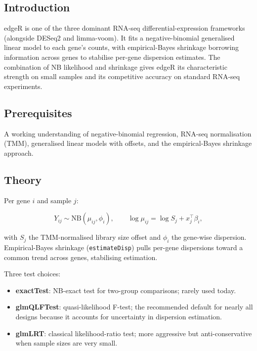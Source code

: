 \documentclass[
]{article}
\author{}
\date{\vspace{-2.5em}}
\providecommand{\tightlist}{%
  \setlength{\itemsep}{0pt}\setlength{\parskip}{0pt}}
\begin{document}
\subsection{Introduction}\label{introduction}

edgeR is one of the three dominant RNA-seq differential-expression
frameworks (alongside DESeq2 and limma-voom). It fits a
negative-binomial generalised linear model to each gene's counts, with
empirical-Bayes shrinkage borrowing information across genes to
stabilise per-gene dispersion estimates. The combination of NB
likelihood and shrinkage gives edgeR its characteristic strength on
small samples and its competitive accuracy on standard RNA-seq
experiments.

\subsection{Prerequisites}\label{prerequisites}

A working understanding of negative-binomial regression, RNA-seq
normalisation (TMM), generalised linear models with offsets, and the
empirical-Bayes shrinkage approach.

\subsection{Theory}\label{theory}

Per gene \(i\) and sample \(j\):

\[Y_{ij} \sim \mathrm{NB}(\mu_{ij}, \phi_i), \qquad \log \mu_{ij} = \log S_j + x_j^\top \beta_i,\]

with \(S_j\) the TMM-normalised library size offset and \(\phi_i\) the
gene-wise dispersion. Empirical-Bayes shrinkage (\texttt{estimateDisp})
pulls per-gene dispersions toward a common trend across genes,
stabilising estimation.

Three test choices:

\begin{itemize}
\tightlist
\item
  \textbf{exactTest}: NB-exact test for two-group comparisons; rarely
  used today.
\item
  \textbf{glmQLFTest}: quasi-likelihood F-test; the recommended default
  for nearly all designs because it accounts for uncertainty in
  dispersion estimation.
\item
  \textbf{glmLRT}: classical likelihood-ratio test; more aggressive but
  anti-conservative when sample sizes are very small.
\end{itemize}
\end{document}
